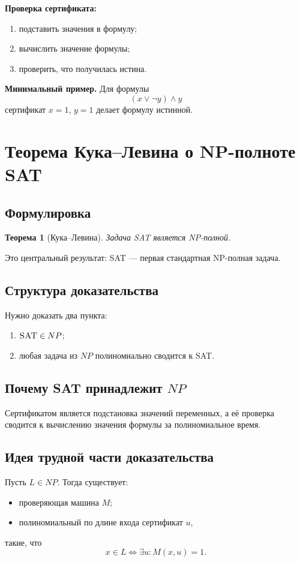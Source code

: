 \documentclass[12pt,a4paper]{article}
\theoremstyle{definition}
\theoremstyle{plain}
\newtheorem{theorem}{Теорема}[section]
\begin{document}
\textbf{Проверка сертификата:}
\begin{enumerate}
\item подставить значения в формулу;
\item вычислить значение формулы;
\item проверить, что получилась истина.
\end{enumerate}

\textbf{Минимальный пример.}
Для формулы
\[
(x\vee \neg y)\wedge y
\]
сертификат $x=1$, $y=1$ делает формулу истинной.

\section{Теорема Кука--Левина о NP-полноте \texorpdfstring{\textsc{SAT}}{SAT}}

\subsection{Формулировка}
\begin{theorem}[Кука--Левина]
Задача \textsc{SAT} является NP-полной.
\end{theorem}

Это центральный результат: \textsc{SAT} --- первая стандартная NP-полная задача.

\subsection{Структура доказательства}
Нужно доказать два пункта:
\begin{enumerate}
\item $\textsc{SAT}\in NP$;
\item любая задача из $NP$ полиномиально сводится к \textsc{SAT}.
\end{enumerate}

\subsection{Почему \textsc{SAT} принадлежит \texorpdfstring{$NP$}{NP}}
Сертификатом является подстановка значений переменных, а её проверка сводится к вычислению значения формулы за полиномиальное время.

\subsection{Идея трудной части доказательства}
Пусть $L\in NP$. Тогда существует:
\begin{itemize}
\item проверяющая машина $M$;
\item полиномиальный по длине входа сертификат $u$,
\end{itemize}
такие, что
\[
x\in L \iff \exists u\colon M(x,u)=1.
\]
\end{document}
